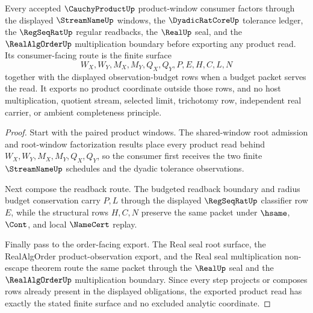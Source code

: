 \begin{theorem}
\label{thm:cauchy-product-product-window-consumer-handoff}
Every accepted $\CauchyProductUp$ product-window consumer factors through the displayed $\StreamNameUp$ windows, the $\DyadicRatCoreUp$ tolerance ledger, the $\RegSeqRatUp$ regular readbacks, the $\RealUp$ seal, and the $\RealAlgOrderUp$ multiplication boundary before exporting any product read. Its consumer-facing route is the finite surface
$$
W_X,W_Y,M_X,M_Y,Q_X,Q_Y,P,E,H,C,L,N
$$
together with the displayed observation-budget rows when a budget packet serves the read. It exports no product coordinate outside those rows, and no host multiplication, quotient stream, selected limit, trichotomy row, independent real carrier, or ambient completeness principle.
\end{theorem}
\begin{proof}
Start with the paired product windows. The shared-window root admission and root-window factorization results place every product read behind $W_X,W_Y,M_X,M_Y,Q_X,Q_Y$, so the consumer first receives the two finite $\StreamNameUp$ schedules and the dyadic tolerance observations.

Next compose the readback route. The budgeted readback boundary and radius budget conservation carry $P,L$ through the displayed $\RegSeqRatUp$ classifier row $E$, while the structural rows $H,C,N$ preserve the same packet under $\hsame$, $\Cont$, and local $\NameCert$ replay.

Finally pass to the order-facing export. The Real seal root surface, the RealAlgOrder product-observation export, and the Real seal multiplication non-escape theorem route the same packet through the $\RealUp$ seal and the $\RealAlgOrderUp$ multiplication boundary. Since every step projects or composes rows already present in the displayed obligations, the exported product read has exactly the stated finite surface and no excluded analytic coordinate.
\end{proof}

